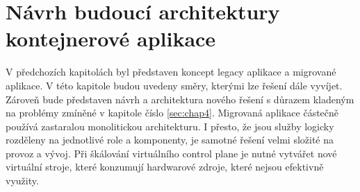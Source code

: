 \chapter{Návrh budoucí architektury kontejnerové aplikace}\label{sec:chap5}
V předchozích kapitolách byl představen koncept legacy aplikace a migrované aplikace. V této kapitole budou uvedeny směry, kterými lze řešení dále vyvíjet. Zároveň bude představen návrh a architektura nového řešení s důrazem kladeným na problémy zmíněné v kapitole číslo \ref{sec:chap4}. Migrovaná aplikace částečně používá zastaralou monolitickou architekturu. I přesto, že jsou služby logicky rozděleny na jednotlivé role a komponenty, je samotné řešení velmi složité na provoz a vývoj. Při škálování virtuálního control plane je nutné vytvářet nové virtuální stroje, které konzumují hardwarové zdroje, které nejsou efektivně využity.

